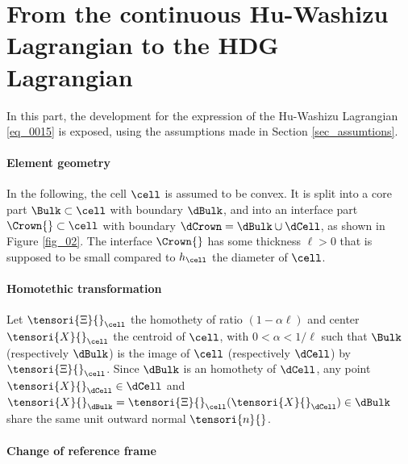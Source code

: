 \section{From the continuous Hu-Washizu Lagrangian to the HDG Lagrangian}
\label{sec_appendix_Hu_Washizu}

In this part, the development for the expression of the Hu-Washizu Lagrangian \eqref{eq_0015} is exposed, using the assumptions made in Section \ref{sec_assumtions}.

\paragraph{Element geometry}

In the following, the cell $\cell$ is assumed to be convex.
It is split into a core part $\Bulk \subset \cell$ with boundary $\dBulk$, and into an interface part $\Crown{} \subset \cell$ with boundary $\dCrown = \dBulk \cup \dCell$, as shown in Figure \ref{fig_02}. The interface $\Crown{}$ has some thickness $\ell > 0$ that is supposed to be small compared to $h_{\cell}$ the diameter of $\cell$.

\paragraph{Homotethic transformation}

Let $\tensori{\Xi}{}_{\cell}$ the homothety of ratio $(1 - \alpha \ell)$ and center $\tensori{X}{}_{\cell}$ the centroid of $\cell$, with $0 < \alpha < 1 / \ell$ such that $\Bulk$ (respectively $\dBulk$) is the image of $\cell$ (respectively $\dCell$) by $\tensori{\Xi}{}_{\cell}$. Since $\dBulk$ is an homothety of $\dCell$, any point $\tensori{X}{}_{\dCell} \in \dCell$ and $\tensori{X}{}_{\dBulk} = \tensori{\Xi}{}_{\cell}(\tensori{X}{}_{\dCell}) \in \dBulk$ share the same unit outward normal $\tensori{n}{}$.

\paragraph{Change of reference frame}

